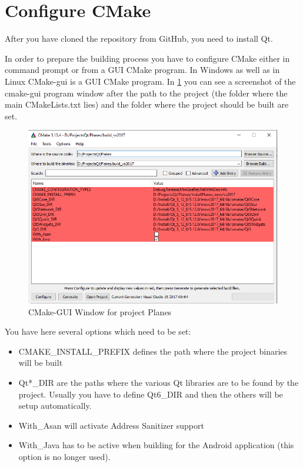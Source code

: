 \section{Configure CMake}

After you have cloned the repository from GitHub, you need to install Qt.

In order to prepare the building process you have to configure CMake either in command prompt or from a GUI CMake program. In Windows as well as in Linux CMake-gui is a GUI CMake program. In \ref{fig:cmakegui_planes} you can see a screenshot of the cmake-gui program window after the path to the project (the folder where the main CMakeLists.txt lies) and the folder where the project should be built are set.


\begin{figure}[h]
	\includegraphics[width = \textwidth]{PlanesCPlusPlus_CMAKE_GUI_Window.png}
	\caption{CMake-GUI Window for project Planes}
	\label{fig:cmakegui_planes}
\end{figure}

You have here several options which need to be set:

\begin{itemize}
	\item CMAKE\_INSTALL\_PREFIX defines the path where the project binaries will be built
	\item Qt*\_DIR are the paths where the various Qt libraries are to be found by the project. Usually you have to define Qt6\_DIR and then the others will be setup automatically.
	\item With\_Asan will activate Address Sanitizer support
	\item With\_Java has to be active when building for the Android application (this option is no longer used).
\end{itemize}

